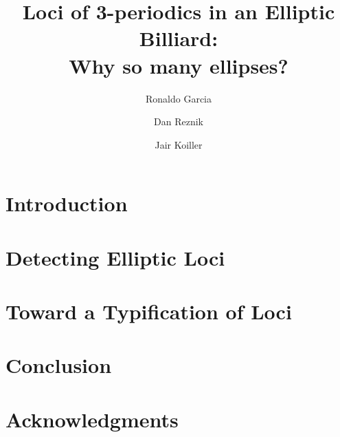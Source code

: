 \documentclass[11pt]{amsart}
\title[3-periodics: why so many ellipses?]{Loci of 3-periodics in an Elliptic Billiard:\\Why so many ellipses?}
\author{Ronaldo Garcia}
\author{Dan Reznik}
\author{Jair Koiller}
\begin{document}

\modulolinenumbers[1]

\maketitle

\section{Introduction}
\label{sec:intro}


\section{Detecting Elliptic Loci}
\label{sec:loci_geom}


\section{Toward a Typification of Loci}
\label{sec:algebraic}


\section{Conclusion}
\label{sec:conclusion}


\section*{Acknowledgments}


%

\appendix


 
%

\end{document}
